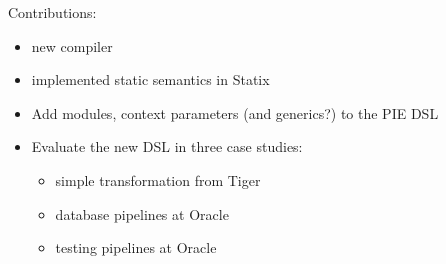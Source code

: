 Contributions:
\begin{itemize}
  \item new compiler
  \item implemented static semantics in Statix
  \item Add modules, context parameters (and generics?) to the PIE DSL
  \item Evaluate the new DSL in three case studies:
  \begin{itemize}
    \item simple transformation from Tiger
    \item database pipelines at Oracle
    \item testing pipelines at Oracle
  \end{itemize}
\end{itemize}
